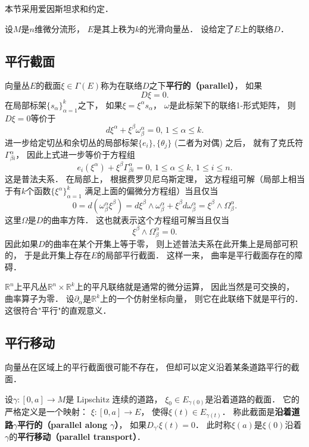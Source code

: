 

本节采用爱因斯坦求和约定．

设$M$是$n$维微分流形， $E$是其上秩为$k$的光滑向量丛． 设给定了$E$上的联络$D$．

\subsection{平行截面}

向量丛$E$的截面$\xi\in\Gamma(E)$称为在联络$D$之下\textbf{平行的（parallel）}， 如果
$$D\xi=0.$$
在局部标架$\{s_\alpha\}_{\alpha=1}^k$之下， 如果$\xi=\xi^\alpha s_\alpha$， $\omega$是此标架下的联络1-形式矩阵， 则$D\xi=0$等价于
$$
d\xi^\alpha+\xi^\beta\omega^\alpha_\beta=0,\,1\leq \alpha\leq k.
$$
进一步给定切丛和余切丛的局部标架$\{e_i\},\{\theta_j\}$ (二者为对偶) 之后， 就有了克氏符$\Gamma_{\beta i}^\alpha$， 因此上式进一步等价于方程组
$$
e_i(\xi^\alpha)+\xi^\beta\Gamma^\alpha_{\beta i}=0,\,1\leq \alpha\leq k,\,1\leq i\leq n.
$$
这是普法夫系． 在局部上， 根据费罗贝尼乌斯定理， 这方程组可解（局部上相当于有$k$个函数$\{\xi^\alpha\}_{\alpha=1}^k$ 满足上面的偏微分方程组）当且仅当
$$
0=d(\omega^\alpha_\beta\xi^\beta)=d\xi^\beta\wedge\omega^\alpha_\beta+\xi^\beta d\omega^\alpha_\beta=\xi^\beta\wedge\Omega_\beta^\alpha.
$$
这里$\Omega$是$D$的曲率方阵． 这也就表示这个方程组可解当且仅当
$$
\xi^\beta\wedge\Omega_\beta^\alpha=0.
$$
因此如果$D$的曲率在某个开集上等于零， 则上述普法夫系在此开集上是局部可积的， 于是此开集上存在$E$的局部平行截面． 这样一来， 曲率是平行截面存在的障碍．

$\mathbb{R}^n$上平凡丛$\mathbb{R}^n\times\mathbb{R}^k$上的平凡联络就是通常的微分运算， 因此当然是可交换的， 曲率算子为零． 设$\partial_\alpha$是$\mathbb{R}^k$上的一个仿射坐标向量， 则它在此联络下就是平行的． 这很符合"平行"的直观意义． 

\subsection{平行移动}
向量丛在区域上的平行截面很可能不存在， 但却可以定义沿着某条道路平行的截面． 

设$\gamma:[0,a]\to M$是 Lipschitz 连续的道路， $\xi_0\in E_{\gamma(0)}$是沿着道路的截面． 它的严格定义是一个映射： $\xi:[0,a]\to E$， 使得$\xi(t)\in E_{\gamma(t)}$． 称此截面是\textbf{沿着道路$\gamma$平行的（parallel along $\gamma$）}， 如果$D_{\gamma'}\xi(t)=0$． 此时称$\xi(a)$是$\xi(0)$沿着$\gamma$的\textbf{平行移动（parallel transport）}．

